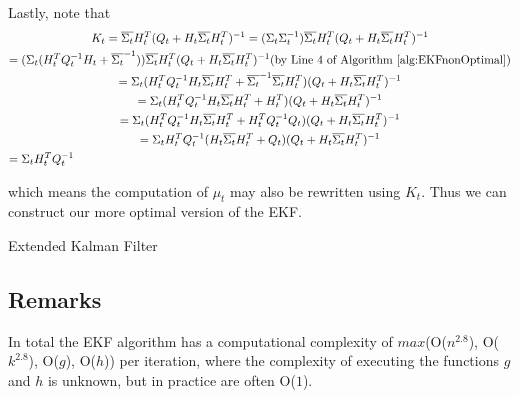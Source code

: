 Lastly, note that
\begin{multline}
K_t = \overline{\Sigma_t} H_t^T (Q_t + H_t \overline{\Sigma_t} H_t^T)^{-1} = (\Sigma_t \Sigma_t^{-1}) \overline{\Sigma_t} H_t^T (Q_t + H_t \overline{\Sigma_t} H_t^T)^{-1} \\
= (\Sigma_t (H_t^T Q_t^{-1} H_t + \overline{\Sigma_t}^{-1})) \overline{\Sigma_t} H_t^T (Q_t + H_t \overline{\Sigma_t} H_t^T)^{-1} \hfill \text{(by Line 4 of Algorithm \ref{alg:EKFnonOptimal})} \\
= \Sigma_t (H_t^T Q_t^{-1} H_t \overline{\Sigma_t} H_t^T + \overline{\Sigma_t}^{-1} \overline{\Sigma_t} H_t^T) (Q_t + H_t \overline{\Sigma_t} H_t^T)^{-1} \\
= \Sigma_t (H_t^T Q_t^{-1} H_t \overline{\Sigma_t} H_t^T + H_t^T) (Q_t + H_t \overline{\Sigma_t} H_t^T)^{-1} \\
= \Sigma_t (H_t^T Q_t^{-1} H_t \overline{\Sigma_t} H_t^T + H_t^T Q_t^{-1} Q_t) (Q_t + H_t \overline{\Sigma_t} H_t^T)^{-1} \\
= \Sigma_t H_t^T Q_t^{-1} ( H_t \overline{\Sigma_t} H_t^T + Q_t) (Q_t + H_t \overline{\Sigma_t} H_t^T)^{-1} \\
= \Sigma_t H_t^T Q_t^{-1} \hfill
\end{multline}

which means the computation of \(\mu_t\) may also be rewritten using \(K_t\). Thus we can construct our more optimal version of the EKF.
\begin{algorithm} 
	\caption{Extended Kalman Filter}
	\label{alg:EKFOptimal}
	\begin{algorithmic}[1]
		\State {}
		\EndFunction
	\end{algorithmic}
\end{algorithm}

\subsection{Remarks}
In total the EKF algorithm has a computational complexity of \(max\)(O(\(n^{2.8}\)), O(\(k^{2.8}\)), O(\(g\)), O(\(h\))) per iteration, where the complexity of executing the functions \(g\) and \(h\) is unknown, but in practice are often O(\(1\)).

